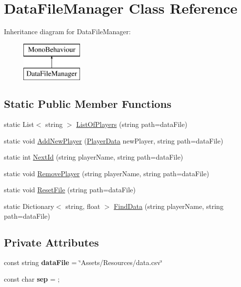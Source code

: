 \hypertarget{class_data_file_manager}{}\section{Data\+File\+Manager Class Reference}
\label{class_data_file_manager}
Inheritance diagram for Data\+File\+Manager\+:\begin{figure}[H]
\begin{center}
\leavevmode
\includegraphics[height=2.000000cm]{class_data_file_manager}
\end{center}
\end{figure}
\subsection*{Static Public Member Functions}
\begin{DoxyCompactItemize}
\item 
static List$<$ string $>$ \mbox{\hyperlink{class_data_file_manager_a4591520b1adccc1d369299d4e1e5242d}{List\+Of\+Players}} (string path=data\+File)
\item 
static void \mbox{\hyperlink{class_data_file_manager_a83fdebc539d60b35d9f59fd74744a6ee}{Add\+New\+Player}} (\mbox{\hyperlink{class_player_data}{Player\+Data}} new\+Player, string path=data\+File)
\item 
static int \mbox{\hyperlink{class_data_file_manager_adb1a1aefda32170d551cc8103183a070}{Next\+Id}} (string player\+Name, string path=data\+File)
\item 
static void \mbox{\hyperlink{class_data_file_manager_a326a5c6038fcba1b949e825e7f67c9e7}{Remove\+Player}} (string player\+Name, string path=data\+File)
\item 
static void \mbox{\hyperlink{class_data_file_manager_a216fccaf83f9be400a0b8df1466f1ce0}{Reset\+File}} (string path=data\+File)
\item 
static Dictionary$<$ string, float $>$ \mbox{\hyperlink{class_data_file_manager_a777e64910320c8dbba175e760da4dd0c}{Find\+Data}} (string player\+Name, string path=data\+File)
\end{DoxyCompactItemize}
\subsection*{Private Attributes}
\begin{DoxyCompactItemize}
\item 
\mbox{\label{class_data_file_manager_a41992b6c9e5301078646d1ed95b5d644}} 
const string {\bfseries data\+File} = \char`\"{}Assets/Resources/data.\+csv\char`\"{}
\item 
\mbox{\label{class_data_file_manager_a095786775b10f9c1aefc686e4da005fa}} 
const char {\bfseries sep} = \textquotesingle{};\textquotesingle{}
\end{DoxyCompactItemize}


